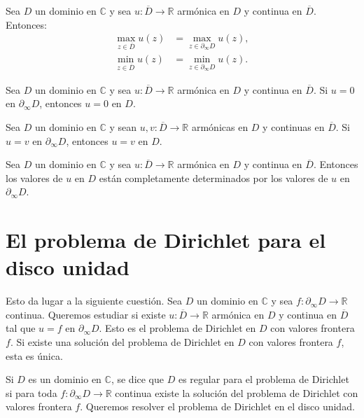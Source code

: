 \begin{corollary}
    Sea $D$ un dominio en $\mathbb{C}$ y sea $u: \overline{D} \to \mathbb{R}$ armónica en $D$ y continua en $\overline{D}$.
    Entonces:
    \begin{align*}
        \max_{z \in \overline{D}} u(z) & = \max_{z \in \partial_\infty D} u(z), \\
        \min_{z \in \overline{D}} u(z) & = \min_{z \in \partial_\infty D} u(z).
    \end{align*}
\end{corollary}

\begin{corollary}
    Sea $D$ un dominio en $\mathbb{C}$ y sea $u: \overline{D} \to \mathbb{R}$ armónica en $D$ y continua en $\overline{D}$.
    Si $u = 0$ en $\partial_\infty D$, entonces $u = 0$ en $D$.
\end{corollary}

\begin{corollary}
    Sea $D$ un dominio en $\mathbb{C}$ y sean $u, v: \overline{D} \to \mathbb{R}$ armónicas en $D$ y continuas en $\overline{D}$.
    Si $u = v$ en $\partial_\infty D$, entonces $u = v$ en $D$.
\end{corollary}

\begin{remark}
    Sea $D$ un dominio en $\mathbb{C}$ y sea $u: \overline{D} \to \mathbb{R}$ armónica en $D$ y continua en $\overline{D}$.
    Entonces los valores de $u$ en $D$ están completamente determinados por los valores de $u$ en $\partial_\infty D$.
\end{remark}

\section{El problema de Dirichlet para el disco unidad}
Esto da lugar a la siguiente cuestión.
Sea $D$ un dominio en $\mathbb{C}$ y sea $f: \partial_\infty D \to \mathbb{R}$ continua.
Queremos estudiar si existe $u: \overline{D} \to \mathbb{R}$ armónica en $D$ y continua en $\overline{D}$ tal que $u = f$ en $\partial_\infty D$.
Esto es el problema de Dirichlet en $D$ con valores frontera $f$.
Si existe una solución del problema de Dirichlet en $D$ con valores frontera $f$, esta es única.

Si $D$ es un dominio en $\mathbb{C}$, se dice que $D$ es regular para el problema de Dirichlet si para toda $f: \partial_\infty D \to \mathbb{R}$ continua existe la solución del problema de Dirichlet con valores frontera $f$.
Queremos resolver el problema de Dirichlet en el disco unidad.

